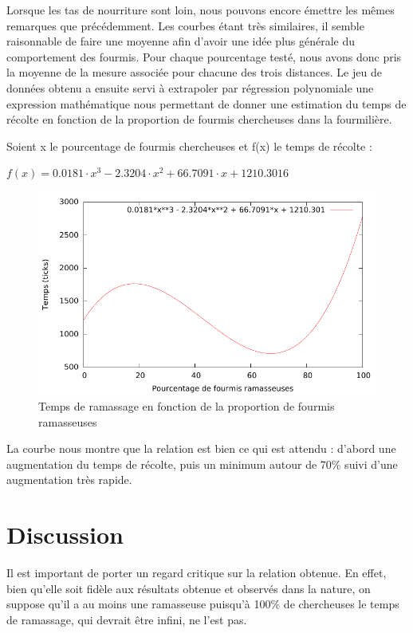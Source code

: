 \documentclass{article}
\begin{document}
Lorsque les tas de nourriture sont loin, nous pouvons encore émettre les mêmes remarques que précédemment. Les courbes étant très similaires, il semble raisonnable de faire une moyenne afin d'avoir une idée plus générale du comportement des fourmis. Pour chaque pourcentage testé, nous avons donc pris la moyenne de la mesure associée pour chacune des trois distances. Le jeu de données obtenu a ensuite servi à extrapoler par régression polynomiale une expression mathématique nous permettant de donner une estimation du temps de récolte en fonction de la proportion de fourmis chercheuses dans la fourmilière. 

Soient x le pourcentage de fourmis chercheuses et f(x) le temps de récolte :

\begin{math}
 f(x) = 0.0181\cdot x^3 - 2.3204\cdot x^2 + 66.7091\cdot x + 1210.3016
 \end{math}

\begin{figure}[H]
\centering
\includegraphics[scale=0.6]{contenu/avg.pdf}
\caption{Temps de ramassage en fonction de la proportion de fourmis ramasseuses}
\label{fig:relation}
\end{figure}

La courbe nous montre que la relation est bien ce qui est attendu : d'abord une augmentation du temps de récolte, puis un minimum autour de 70\% suivi d'une augmentation très rapide.
\section{Discussion}
Il est important de porter un regard critique sur la relation obtenue. En effet, bien qu'elle soit fidèle aux résultats obtenue et observés dans la nature, on suppose qu'il a au moins une ramasseuse puisqu'à 100\% de chercheuses le temps de ramassage, qui devrait être infini, ne l'est pas.
\end{document}
